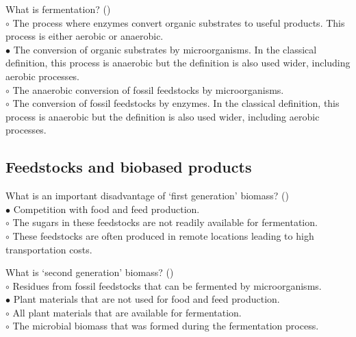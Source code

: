 \documentclass[]{beamer}
\begin{document}
\begin{CJK}{UTF8}{gbsn}
\begin{frame}[shrink] {} 
\addtocounter{answers}{1}
\color{blue}
  What is fermentation? 
 ({})\\
\color{black}
\setlength{\parindent}{-0.4cm}
{\color{red}$\circ$} The process where enzymes convert organic substrates to useful products. This process is either aerobic or anaerobic.  \\
{\color{red}$\bullet$} The conversion of organic substrates by microorganisms. In the classical definition, this process is anaerobic but the definition is also used wider, including aerobic processes.  \\
{\color{red}$\circ$} The anaerobic conversion of fossil feedstocks by microorganisms.  \\
{\color{red}$\circ$} The conversion of fossil feedstocks by enzymes. In the classical definition, this process is anaerobic but the definition is also used wider, including aerobic processes.  \\

\end{frame}
\subsection{Feedstocks and biobased products }
\setcounter{answers}{0}


\begin{frame}[shrink] {} 
\addtocounter{answers}{1}
\color{blue}
  What is an important disadvantage of ‘first generation’ biomass?
 ({})\\
\color{black}
\setlength{\parindent}{-0.4cm}
{\color{red}$\bullet$} Competition with food and feed production.  \\
{\color{red}$\circ$} The sugars in these feedstocks are not readily available for fermentation.  \\
{\color{red}$\circ$} These feedstocks are often produced in remote locations leading to high transportation costs.  \\
\end{frame}


\begin{frame}[shrink] {} 
\addtocounter{answers}{1}
\color{blue}
  What is ‘second generation’ biomass?
 ({})\\
\color{black}
\setlength{\parindent}{-0.4cm}
{\color{red}$\circ$} Residues from fossil feedstocks that can be fermented by microorganisms.  \\
{\color{red}$\bullet$} Plant materials that are not used for food and feed production.  \\
{\color{red}$\circ$} All plant materials that are available for fermentation.  \\
{\color{red}$\circ$} The microbial biomass that was formed during the fermentation process.  \\
\end{frame}



\end{CJK}
\end{document}
